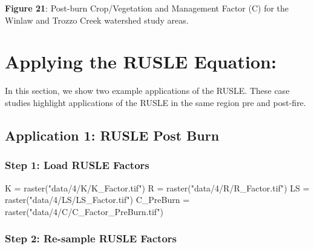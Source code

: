\documentclass[
]{article}
\newenvironment{Shaded}{\begin{snugshade}}{\end{snugshade}}
\newcommand{\FunctionTok}[1]{\textcolor[rgb]{0.00,0.00,0.00}{#1}}
\newcommand{\NormalTok}[1]{#1}
\newcommand{\OtherTok}[1]{\textcolor[rgb]{0.56,0.35,0.01}{#1}}
\newcommand{\StringTok}[1]{\textcolor[rgb]{0.31,0.60,0.02}{#1}}
\begin{document}
\textbf{Figure 21}: Post-burn Crop/Vegetation and Management Factor (C) for the Winlaw and Trozzo Creek watershed study areas.

\hypertarget{sec-applying-the-rusle-equation}{%
\section*{Applying the RUSLE Equation:}\label{sec-applying-the-rusle-equation}}

In this section, we show two example applications of the RUSLE. These case studies highlight applications of the RUSLE in the same region pre and post-fire.

\hypertarget{sec-application-1-rusle-post-burn}{%
\subsection*{Application 1: RUSLE Post Burn}\label{sec-application-1-rusle-post-burn}}

\hypertarget{sec-step-1-load-rusle-factors}{%
\subsubsection*{Step 1: Load RUSLE Factors}\label{sec-step-1-load-rusle-factors}}

\begin{Shaded}
\begin{Highlighting}[]
\NormalTok{K }\OtherTok{=} \FunctionTok{raster}\NormalTok{(}\StringTok{"data/4/K/K\_Factor.tif"}\NormalTok{)}
\NormalTok{R }\OtherTok{=} \FunctionTok{raster}\NormalTok{(}\StringTok{"data/4/R/R\_Factor.tif"}\NormalTok{)}
\NormalTok{LS }\OtherTok{=} \FunctionTok{raster}\NormalTok{(}\StringTok{"data/4/LS/LS\_Factor.tif"}\NormalTok{)}
\NormalTok{C\_PreBurn }\OtherTok{=} \FunctionTok{raster}\NormalTok{(}\StringTok{"data/4/C/C\_Factor\_PreBurn.tif"}\NormalTok{)}
\end{Highlighting}
\end{Shaded}

\hypertarget{sec-step-3-re-sample-rusle-factors}{%
\subsubsection*{Step 2: Re-sample RUSLE Factors}\label{sec-step-3-re-sample-rusle-factors}}
\end{document}
